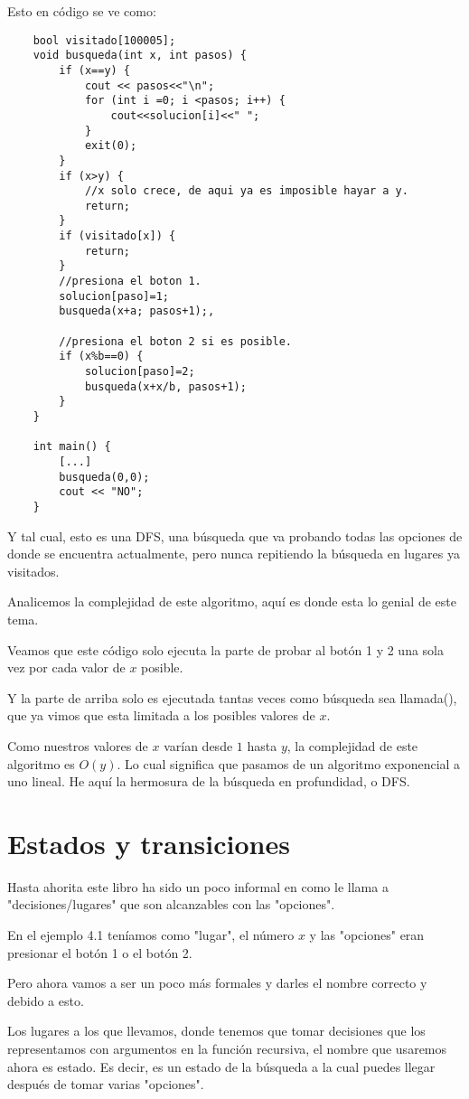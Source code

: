Esto en código se ve como:
\pagebreak
\begin{lstlisting}
	bool visitado[100005];
	void busqueda(int x, int pasos) {
		if (x==y) {
			cout << pasos<<"\n";
			for (int i =0; i <pasos; i++) {
				cout<<solucion[i]<<" ";
			}			
			exit(0);
		}
		if (x>y) {
			//x solo crece, de aqui ya es imposible hayar a y.
			return;
		}
		if (visitado[x]) {			
			return;
		}
		//presiona el boton 1.
		solucion[paso]=1;
		busqueda(x+a; pasos+1);,
		
		//presiona el boton 2 si es posible.
		if (x%b==0) {
			solucion[paso]=2;
			busqueda(x+x/b, pasos+1);
		}
	}
	
	int main() {
		[...]
		busqueda(0,0);
		cout << "NO";
	}
\end{lstlisting}

Y tal cual, esto es una DFS, una búsqueda que va probando todas las opciones de donde se encuentra actualmente, pero nunca repitiendo la búsqueda en lugares ya visitados.

Analicemos la complejidad de este algoritmo, aquí es donde esta lo genial de este tema.

Veamos que este código solo ejecuta la parte de probar al botón 1 y 2 una sola vez por cada valor de \(x\) posible.

Y la parte de arriba solo es ejecutada tantas veces como búsqueda sea llamada(), que ya vimos que esta limitada a los posibles valores de \(x\).

Como nuestros valores de \(x\) varían desde \(1\) hasta \(y\), la complejidad de este algoritmo es \(O(y)\). Lo cual significa que pasamos de un algoritmo exponencial a uno lineal. He aquí la hermosura de la búsqueda en profundidad, o DFS.

\section*{Estados y transiciones}
Hasta ahorita este libro ha sido un poco informal en como le llama a "decisiones/lugares" que son alcanzables con las "opciones".

En el ejemplo 4.1 teníamos como "lugar", el número \(x\) y las "opciones" eran presionar el botón 1 o el botón 2.

Pero ahora vamos a ser un poco más formales y darles el nombre correcto y debido a esto. 

Los lugares a los que llevamos, donde tenemos que tomar decisiones que los representamos con argumentos en la función recursiva, el nombre que usaremos ahora es estado. Es decir, es un estado de la búsqueda a la cual puedes llegar después de tomar varias "opciones".


